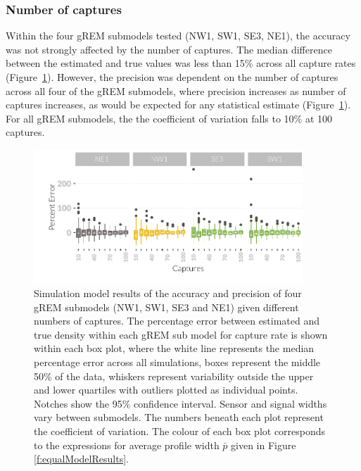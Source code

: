 \subsubsection{Number of captures}

Within the four gREM submodels tested (NW1, SW1, SE3, NE1), the accuracy was not strongly affected by the number of captures.
The median difference between the estimated and true values was less than 15\% across all capture rates (Figure~\ref{fig:Captures}).
However, the precision was dependent on the number of captures across all four of the gREM submodels, where precision increases as number of captures increases, as would be expected for any statistical estimate (Figure~\ref{fig:Captures}).
For all gREM submodels, the the coefficient of variation falls to 10\% at 100 captures. 



\begin{knitrout}\footnotesize
{}\color{fgcolor}\begin{figure}[t]

{\centering \includegraphics[width=0.9\textwidth]{figure/Captures-1} 

}

\caption[Simulation model results of the accuracy and precision of four gREM submodels]{
Simulation model results of the accuracy and precision of four gREM submodels (NW1, SW1, SE3 and NE1) given different numbers of captures.
The percentage error between estimated and true density within each gREM sub model for capture rate is shown within each box plot, where the white line represents the median percentage error across all simulations, boxes represent the middle 50\% of the data, whiskers represent variability outside the upper and lower quartiles with outliers plotted as individual points.
Notches show the 95\% confidence interval.
Sensor and signal widths vary between submodels.
The numbers beneath each plot represent the coefficient of variation.
The colour of each box plot corresponds to the expressions for average profile width $\bar{p}$ given in Figure \ref{f:equalModelResults}. 
}\label{fig:Captures}
\end{figure}


\end{knitrout}

